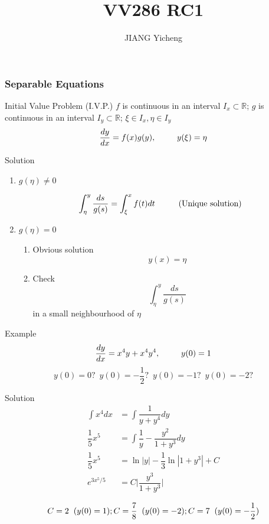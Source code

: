 \documentclass{beamer}
\title{\textcolor[rgb]{0,0.168,0.376}{VV286 RC1}}
\author{JIANG Yicheng}
\begin{document}
\begin{frame}
\titlepage
\end{frame}


\begin{frame}
\frametitle{Separable Equations}
\begin{block}{Initial Value Problem (I.V.P.)}
$f$ is continuous in an interval $I_x\subset \mathbb{R}$; $g$ is continuous in an interval $I_y\subset \mathbb{R}$; $\xi\in I_x, \eta\in I_y$ 
$$\dfrac{dy}{dx}=f(x)g(y),\hspace{9mm}y(\xi)=\eta$$
\end{block}


\end{frame}
\begin{frame}
\begin{block}{Solution}
\begin{enumerate}
\item $g(\eta)\neq0$


$$\int_{\eta}^y\dfrac{ds}{g(s)}=\int_{\xi}^xf(t)dt\hspace{10mm} \text{(Unique solution)}$$
\item $g(\eta)=0$
\begin{enumerate}
\item Obvious solution
$$y(x)=\eta$$
\item Check $$\int_{\eta}^y\dfrac{ds}{g(s)}$$
in a small neighbourhood of $\eta$
\end{enumerate}
\end{enumerate}
\end{block}
\end{frame}


\begin{frame}
\begin{block}{Example}
$$\dfrac{dy}{dx}=x^4y+x^4y^4, \hspace{9mm}y(0)=1$$
$$y(0)=0?\,\,\,y(0)=-\dfrac{1}{2}?\,\,\,y(0)=-1?\,\,\,y(0)=-2?$$

\end{block}
\end{frame}

\begin{frame}
\begin{block}{Solution}
\begin{align*}
\int x^4dx&=\int \dfrac{1}{y+y^4}dy\\
\dfrac{1}{5}x^5&=\int \dfrac{1}{y}-\dfrac{y^2}{1+y^3}dy\\
\dfrac{1}{5}x^5&=\ln |y|-\dfrac{1}{3}\ln |1+y^3|+C\\
e^{3x^5/5}&=C\Bigg|\dfrac{y^3}{1+y^3}\Bigg|\\
\end{align*}
$$C=2\hspace{2mm}(y(0)=1);C=\dfrac{7}{8}\hspace{2mm}(y(0)=-2);C=7\hspace{2mm}(y(0)=-\dfrac{1}{2})$$
\end{block}
\end{frame}
\end{document}
